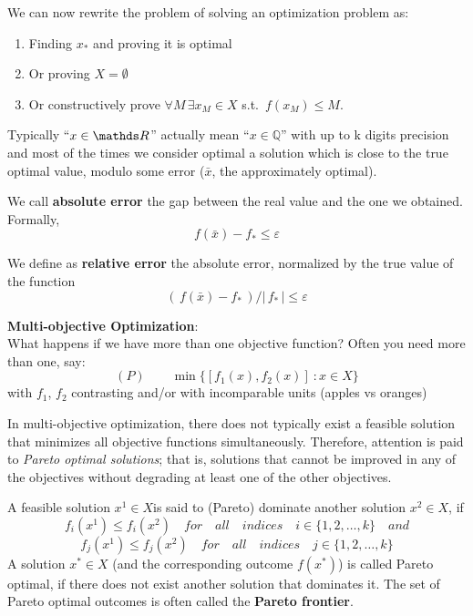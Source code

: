 \documentclass[computationalMathematics.tex]{subfiles}
\begin{document}
\noindent We can now rewrite the problem of solving an optimization problem as:
\begin{enumerate}
  \item Finding $x_*$ and proving it is optimal
  \item Or proving $X = \emptyset$
  \item Or constructively prove $\forall M \, \exists x_M \in X$ s.t.~$f(x_M) \leq M$.
\end{enumerate}

Typically “$x \in \R$” actually mean “$x \in \mathbb{Q}$” with up to k digits precision and most of the times we consider optimal a solution which is close to the true optimal value, modulo some error ($\bar{x}$, the approximately optimal).

\begin{definition}
  We call \textbf{absolute error} the gap between the real value and the one we obtained. Formally,
\[
  f(\bar{x}) - f_* \leq \varepsilon
\]
\end{definition}

\begin{definition}
  We define as \textbf{relative error} the absolute error, normalized by the true value of the function
\[
  ( \, f(\bar{x}) - f_* \, ) / | \, f_* \, | \leq \varepsilon
\]
\end{definition}

\noindent \textbf{Multi-objective Optimization}:\\
What happens if we have more than one objective function?\newline
Often you need more than one, say:
\[
  (P) \qquad \min \{[f_1(x),f_2(x)]~:x \in X\}
\]
with $f_1$, $f_2$ contrasting and/or with incomparable units (apples vs oranges)

In multi-objective optimization, there does not typically exist a feasible solution that minimizes all objective functions simultaneously. Therefore, attention is paid to \emph{Pareto optimal solutions}; that is, solutions that cannot be improved in any of the objectives without degrading at least one of the other objectives.
\begin{definition}
   A feasible solution $x^{1} \in X$is said to (Pareto) dominate another solution $x^{2} \in X$, if
  \[
  f_{i}(x^{1})\leq f_{i}(x^{2})\quad for\quad all\quad indices\quad i \in \{ 1,2,\dots ,k\}\quad and
\]
\[
  f_{j}(x^{1})\leq f_{j}(x^{2})\quad for\quad all\quad indices\quad j \in \{ 1,2,\dots ,k\}
\]
A solution $x^{*}\in X$ (and the corresponding outcome $f(x^{*})$) is called Pareto optimal, if there does not exist another solution that dominates it. The set of Pareto optimal outcomes is often called the \textbf{Pareto frontier}.
\end{definition}
\end{document}
